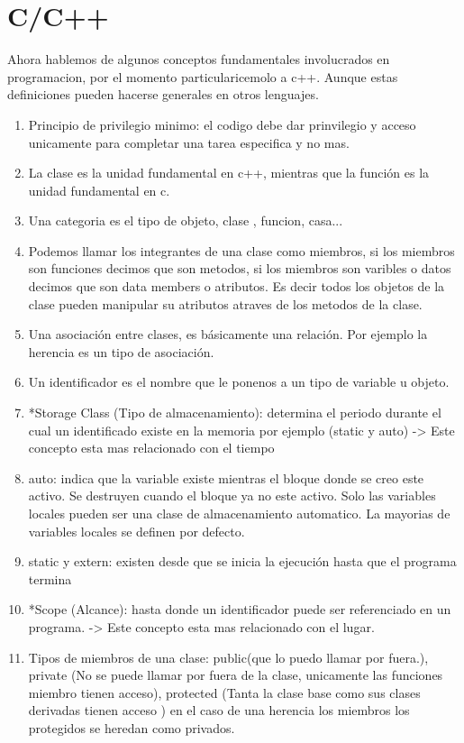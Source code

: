 \documentclass[10pt,a4paper,oneside]{book}
\begin{document}
\section*{C/C++}
Ahora hablemos de algunos conceptos fundamentales involucrados en
programacion, por el momento particularicemolo a c++. Aunque estas
definiciones pueden hacerse generales en otros lenguajes.
\begin{enumerate}
\item Principio de privilegio minimo: el codigo debe dar prinvilegio y
  acceso unicamente para completar una tarea especifica y no mas.
\item La clase es la unidad fundamental en c++, mientras que la
  función es la unidad fundamental en c.
\item Una categoria es el tipo de objeto, clase , funcion, casa...
\item Podemos llamar los integrantes de una clase como miembros, si
  los miembros son funciones decimos que son metodos, si los miembros
  son varibles o datos decimos que son data members o atributos. Es
  decir todos los objetos de la clase pueden manipular su atributos
  atraves de los metodos de la clase.
\item Una asociación entre clases, es básicamente una relación. Por
  ejemplo la herencia es un tipo de asociación.
\item Un identificador es el nombre que le ponenos a un tipo de
  variable u objeto.
\item *Storage Class (Tipo de almacenamiento): determina el periodo
  durante el cual un identificado existe en la memoria por ejemplo
  (static y auto) -> Este concepto esta mas relacionado con el tiempo
\item auto: indica que la variable existe mientras el bloque donde se
  creo este activo. Se destruyen cuando el bloque ya no este
  activo. Solo las variables locales pueden ser una clase de
  almacenamiento automatico. La mayorias de variables locales se
  definen por defecto.
\item static y extern: existen desde que se inicia la ejecución hasta
  que el programa termina
\item *Scope (Alcance): hasta donde un identificador puede ser
  referenciado en un programa. -> Este concepto esta mas relacionado
  con el lugar.
\item Tipos de miembros de una clase: public(que lo puedo llamar por
  fuera.), private (No se puede llamar por fuera de la clase,
  unicamente las funciones miembro tienen acceso), protected (Tanta la
  clase base como sus clases derivadas tienen acceso ) en el caso de
  una herencia los miembros los protegidos se heredan como privados.
  
\end{enumerate}
\end{document}
